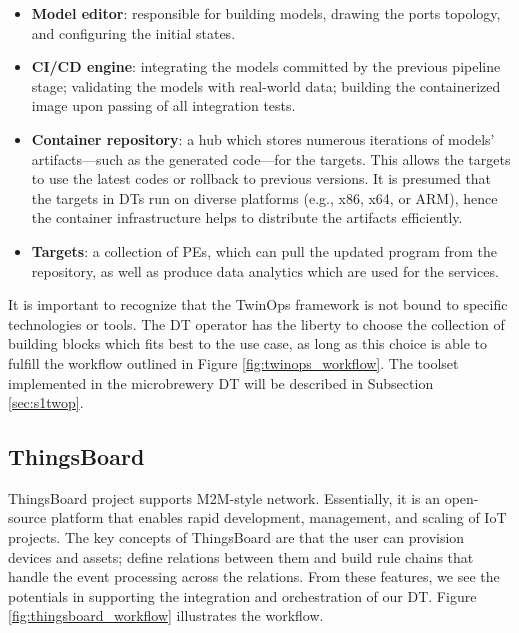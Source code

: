 \begin{itemize}

\item \textbf{Model editor}: responsible for building models, drawing the ports topology, and configuring the initial states. 
\item \textbf{CI/CD engine}: integrating the models committed by the previous pipeline stage; validating the models with real-world data; building the containerized image upon passing of all integration tests.
\item \textbf{Container repository}: a hub which stores numerous iterations of models' artifacts---such as the generated code---for the targets. This allows the targets to use the latest codes or rollback to previous versions. It is presumed that the targets in DTs run on diverse platforms (e.g., x86, x64, or ARM), hence the container infrastructure helps to distribute the artifacts efficiently.
\item \textbf{Targets}: a collection of PEs, which can pull the updated program from the repository, as well as produce data analytics which are used for the services.

\end{itemize}

It is important to recognize that the TwinOps framework is not bound to specific technologies or tools. The DT operator has the liberty to choose the collection of building blocks which fits best to the use case, as long as this choice is able to fulfill the workflow outlined in Figure \ref{fig:twinops_workflow}. The toolset implemented in the microbrewery DT will be described in Subsection \ref{sec:s1twop}.

\subsection{ThingsBoard} \label{sec:selframe_tb}
ThingsBoard \cite{Thingsboard} project supports M2M-style network. Essentially, it is an open-source platform that enables rapid development, management, and scaling of IoT projects. The key concepts of ThingsBoard are that the user can provision devices and assets; define relations between them and build rule chains that handle the event processing across the relations. From these features, we see the potentials in supporting the integration and orchestration of our DT. Figure \ref{fig:thingsboard_workflow} illustrates the workflow.

